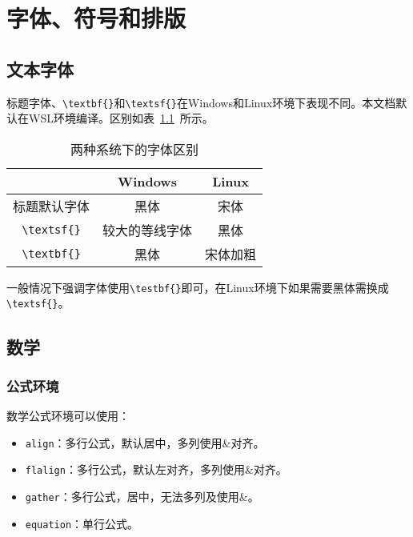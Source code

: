 
\chapter{字体、符号和排版}

\section{文本字体}

标题字体、\verb|\textbf{}|和\verb|\textsf{}|在Windows和Linux环境下表现不同。本文档默认在WSL环境编译。区别如表~\ref{tab-fonts-diff}~所示。

\begin{table}[htbp]
  \centering
  \caption{两种系统下的字体区别}
    \begin{tabular}{ccc}
    \toprule
          & Windows & Linux \\
    \midrule
    标题默认字体 & 黑体    & 宋体 \\
    \verb|\textsf{}| & 较大的等线字体 & 黑体 \\
    \verb|\textbf{}| & 黑体    & 宋体加粗 \\
    \bottomrule
    \end{tabular}%
  \label{tab-fonts-diff}%
\end{table}%

一般情况下强调字体使用\verb|\testbf{}|即可，在Linux环境下如果需要黑体需换成\verb|\textsf{}|。

\section{数学}

\subsection{公式环境}
数学公式环境可以使用：
\begin{itemize}
  \item \verb|align|：多行公式，默认居中，多列使用\&对齐。
  \item \verb|flalign|：多行公式，默认左对齐，多列使用\&对齐。
  \item \verb|gather|：多行公式，居中，无法多列及使用\&。
  \item \verb|equation|：单行公式。
\end{itemize}

